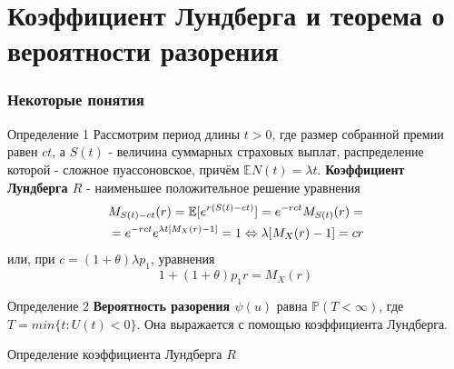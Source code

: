 \documentclass[10pt]{beamer}
\numberwithin{equation}{section}
\begin{document}
\section{Коэффициент Лундберга и теорема о вероятности разорения}
\begin{frame}
\frametitle{Некоторые понятия}
\begin{block}{Определение 1}
    Рассмотрим период длины $t > 0$, где размер собранной  премии равен $ct$, а $S(t)$
    - величина суммарных страховых выплат, распределение которой - сложное пуассоновское,
    причём $\mathbb{E}N(t) = {\lambda}t$.
    \textbf{Коэффициент Лундберга ${R}$} - наименьшее положительное решение уравнения
    \begin{align}
        & M_{S(t)-ct}(r) = \mathbb{E}[e^{r(S(t)-ct)}] = e^{-rct}M_{S(t)}(r) = \notag \\
        & = e^{-rct}e^{{\lambda}t[M_{X}(r)-1]} = 1 \Leftrightarrow {\lambda}[M_{X}(r)-1] = cr
    \end{align}
    или, при $c = (1+{\theta}){\lambda}p_{1}$, уравнения
    \begin{equation} 
        \label{eq:lundberg}
        1+(1+\theta)p_{1}r = M_{X}(r)
    \end{equation}
\end{block}
\begin{block}{Определение 2}
    \textbf{Вероятность разорения $\psi(u)$} равна $\mathbb{P}(T < \infty)$,
    где $T = min\{t: U(t) < 0\}$. Она выражается с помощью коэффициента Лундберга.
\end{block}
\end{frame}


\begin{frame}
\begin{center}

    Определение коэффициента Лундберга $R$
\end{center}
\end{frame}
\end{document}
